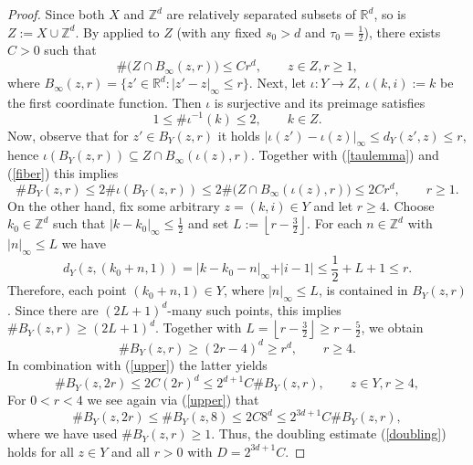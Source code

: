 \documentclass{amsart}
\begin{document}
\begin{proof}
Since both \(X\) and \(\mathbb Z^d\) are relatively separated subsets of $\mathbb{R}^d$, so is $Z:= X\cup\mathbb{Z}^d$. By \cite[Lemma~II.8]{KoBaoff25} applied to $Z$ (with any fixed
\(s_0>d\) and \(\tau_0=\frac{1}{2}\)), there exists \(C>0\) such that
\begin{equation}\label{taulemma}
\# \big(Z\cap B_\infty(z,r) \big)\leq Cr^d, \qquad z\in Z, r \geq 1,    
\end{equation}
where $B_\infty(z,r) = \lbrace z' \in \mathbb{R}^d : \vert z' - z\vert_{\infty} \leq r \rbrace$. Next, let $\iota: Y\to Z,\ \iota(k,i):=k$ be the first coordinate function. Then $\iota$ is surjective and its preimage satisfies
\begin{equation}\label{fiber}
1 \leq \# \iota^{-1}(k) \leq 2, \qquad k\in Z.     
\end{equation}
Now, observe that for \(z'\in B_Y(z,r)\) it holds $\vert \iota(z')-\iota(z)\vert_\infty \leq d_Y(z',z) \leq r$, hence $\iota(B_Y(z,r)) \subseteq Z \cap B_{\infty}(\iota(z),r)$. Together with (\ref{taulemma}) and (\ref{fiber}) this implies
\begin{equation}\label{upper}
\# B_Y(z,r) \leq 2 \# \iota(B_Y(z,r))  \leq  2 \#\big( Z \cap B_\infty(\iota(z),r)\big) \leq 2C r^d, \qquad r\geq 1.
\end{equation}
On the other hand, fix some arbitrary $z = (k,i) \in Y$ and let $r\geq 4$. Choose \(k_0\in\mathbb Z^d\) such that $\vert k-k_0\vert_\infty\leq \frac{1}{2}$ and set $L:=\left\lfloor r-\frac{3}{2}\right\rfloor$. For each \(n\in\mathbb Z^d\) with $\vert n \vert_{\infty} \leq L$  we have 
$$d_Y(z,(k_0 + n,1)) = \vert k - k_0 - n\vert_{\infty} + \vert i -1\vert \leq \frac{1}{2} + L + 1 \leq r.$$
Therefore, each point $(k_0+n,1) \in Y$, where $\vert n \vert_{\infty} \leq L$, is contained in $B_Y(z,r)$. Since there are $(2L+1)^d$-many such points, this implies $\# B_Y(z,r)  \geq (2L+1)^d$. Together with $L = \left\lfloor r-\frac{3}{2}\right\rfloor \geq r - \frac{5}{2}$, we obtain 
$$\# B_Y(z,r)   \geq (2r-4)^d \geq r^d, \qquad r\geq 4.$$
In combination with (\ref{upper}) the latter yields 
\begin{equation}\label{rlarger4}
\# B_Y(z,2r) \leq 2C(2r)^d \leq 2^{d+1}C \# B_Y(z,r) , \qquad z\in Y, r\geq 4,  
\end{equation}
For \(0<r<4\) we see again via (\ref{upper}) that 
$$\# B_Y(z,2r)   \leq \# B_Y(z,8) \leq 2C8^d \leq 2^{3d+1}C \# B_Y(z,r),$$
where we have used $\# B_Y(z,r)  \geq1$. Thus, the doubling estimate (\ref{doubling}) holds for all $z\in Y$ and all \(r>0\) with $D=2^{3d+1}C$.
\end{proof}
\end{document}
